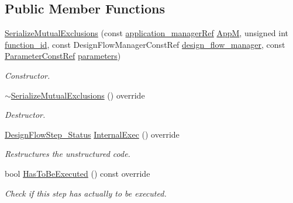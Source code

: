 \subsection*{Public Member Functions}
\begin{DoxyCompactItemize}
\item 
\hyperlink{classSerializeMutualExclusions_ae189dcb417f9d833489fa67984427eaf}{Serialize\+Mutual\+Exclusions} (const \hyperlink{application__manager_8hpp_a04ccad4e5ee401e8934306672082c180}{application\+\_\+manager\+Ref} \hyperlink{classFrontendFlowStep_a0ac0d8db2a378416583f51c4faa59d15}{AppM}, unsigned int \hyperlink{classFunctionFrontendFlowStep_a58ef2383ad1a212a8d3f396625a4b616}{function\+\_\+id}, const Design\+Flow\+Manager\+Const\+Ref \hyperlink{classDesignFlowStep_ab770677ddf087613add30024e16a5554}{design\+\_\+flow\+\_\+manager}, const \hyperlink{Parameter_8hpp_a37841774a6fcb479b597fdf8955eb4ea}{Parameter\+Const\+Ref} \hyperlink{classDesignFlowStep_a802eaafe8013df706370679d1a436949}{parameters})
\begin{DoxyCompactList}\small\item\em Constructor. \end{DoxyCompactList}\item 
\hyperlink{classSerializeMutualExclusions_a48e5dd9db164d311cd27f4f7dd8a2dd4}{$\sim$\+Serialize\+Mutual\+Exclusions} () override
\begin{DoxyCompactList}\small\item\em Destructor. \end{DoxyCompactList}\item 
\hyperlink{design__flow__step_8hpp_afb1f0d73069c26076b8d31dbc8ebecdf}{Design\+Flow\+Step\+\_\+\+Status} \hyperlink{classSerializeMutualExclusions_a7b0969d1c788283b2c103a5b64d44cca}{Internal\+Exec} () override
\begin{DoxyCompactList}\small\item\em Restructures the unstructured code. \end{DoxyCompactList}\item 
bool \hyperlink{classSerializeMutualExclusions_ab1ad51de5bb426b8121949a0f4ceb616}{Has\+To\+Be\+Executed} () const override
\begin{DoxyCompactList}\small\item\em Check if this step has actually to be executed. \end{DoxyCompactList}\end{DoxyCompactItemize}
